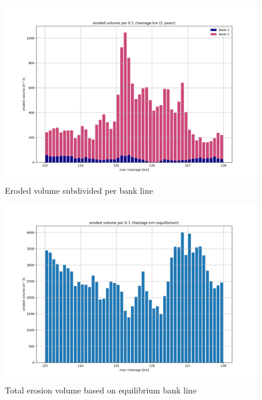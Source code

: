 \begin{figure}
\includegraphics[width=\textwidth]{figures/4_eroded_volume_per_bank.png}
\caption{Eroded volume subdivided per bank line}
\label{Fig2.6b}
\end{figure}
\clearpage
\begin{figure}
\includegraphics[width=\textwidth]{figures/5_eroded_volume_eq.png}
\caption{Total erosion volume based on equilibrium bank line}
\label{Fig2.7}
\end{figure}

